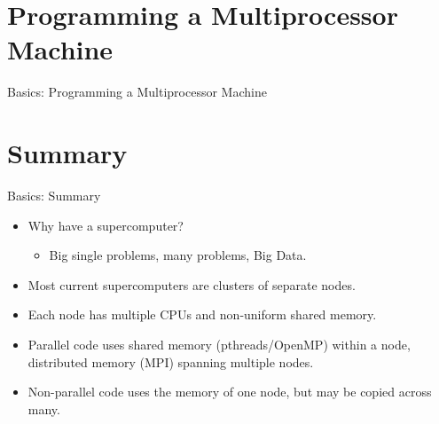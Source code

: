 \section{Programming a Multiprocessor Machine}
\begin{frame}{Basics: Programming a Multiprocessor Machine}

\end{frame}

\section{Summary}

\begin{frame}{Basics: Summary}

  \begin{itemize}
  \item<1->{\alert{Why have a supercomputer?}}
  \begin{itemize}\item<2->{Big single problems, many problems, Big Data.}\end{itemize}
  \item<3->{Most current supercomputers are \alert{clusters} of separate \alert{nodes}.}
  \item<4->{Each node has \alert{multiple CPUs} and \alert{non-uniform shared memory}.}
  \item<5->{\alert{Parallel} code uses shared memory (\alert{pthreads/OpenMP}) within a node, distributed memory (\alert{MPI}) spanning multiple nodes.}
  \item<6->{\alert{Non-parallel} code uses the memory of one node, but may be copied across many.}
  \end{itemize}
  \end{frame}

